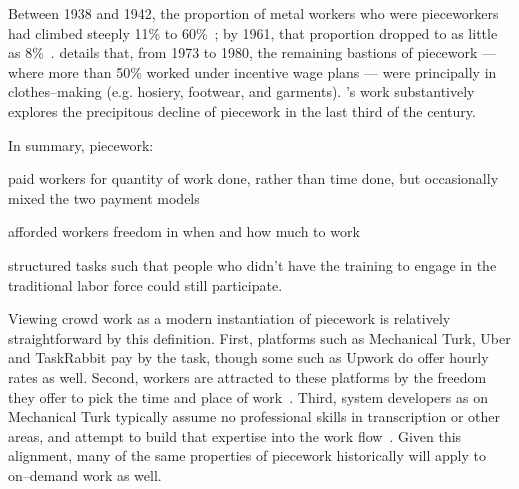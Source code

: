 \documentclass[trackingWork]{subfiles}
\begin{document}
Between 1938 and 1942, the proportion of metal workers who were pieceworkers had climbed steeply 11\% to 60\%~\cite{hart2005piecework};
by 1961, that proportion dropped to as little as 8\%~\cite{carlson1982time}.
\citeauthor{carlson1982time} details that, from 1973 to 1980, the remaining bastions of piecework
--- where more than 50\% worked under incentive wage plans ---
were principally in clothes--making (e.g. hosiery, footwear, and garments).
\citeauthor{hart2013rise}'s work substantively explores the precipitous decline of piecework in the last third of the  century.



In summary, piecework:
\begin{inlinelist}
  \item paid workers for quantity of work done, rather than time done,
        but occasionally mixed the two payment models
  \item afforded workers freedom in when and how much to work
  \item structured tasks such that people who didn't have the training
        to engage in the traditional labor force could still participate.
\end{inlinelist}


Viewing crowd work as a modern instantiation of piecework is relatively straightforward by this definition.
First, platforms such as Mechanical Turk, Uber and TaskRabbit pay by the task, though some such as Upwork do offer hourly rates as well.
Second, workers are attracted to these platforms by the freedom they offer to pick the time and place of work~\cite{martin2014being,whyWouldAnyoneBrewer}.
Third, system developers as on Mechanical Turk typically assume no professional skills in transcription or other areas, and attempt to build that expertise into the work flow~\cite{noronha2011platemate,bernsteinSoylent}.
Given this alignment, many of the same properties of piecework historically will apply to on--demand work as well. 
\end{document}
